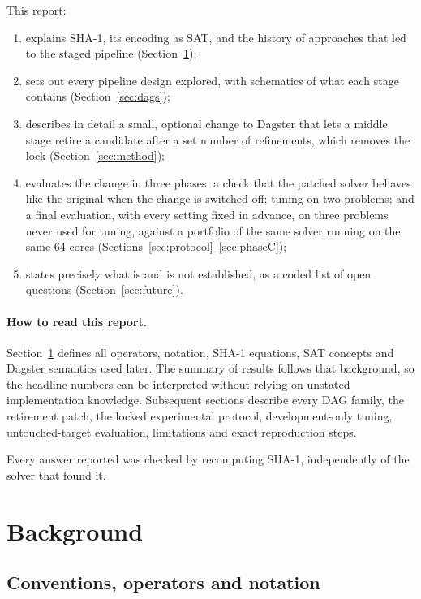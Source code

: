 \documentclass[11pt,a4paper]{article}
\begin{document}
This report:
\begin{enumerate}
\item explains SHA-1, its encoding as SAT, and the history of approaches that led to the
staged pipeline (Section~\ref{sec:background});
\item sets out every pipeline design explored, with schematics of what each stage contains
(Section~\ref{sec:dags});
\item describes in detail a small, optional change to Dagster that lets a middle stage retire a
candidate after a set number of refinements, which removes the lock (Section~\ref{sec:method});
\item evaluates the change in three phases: a check that the patched solver behaves like the original
when the change is switched off; tuning on two problems; and a final evaluation, with every setting
fixed in advance, on three problems never used for tuning, against a portfolio of the same solver
running on the same 64 cores (Sections~\ref{sec:protocol}--\ref{sec:phaseC});
\item states precisely what is and is not established, as a coded list of open questions
(Section~\ref{sec:future}).
\end{enumerate}


\paragraph{How to read this report.}
Section~\ref{sec:background} defines all operators, notation, SHA-1 equations, SAT concepts and
Dagster semantics used later. The summary of results follows that background, so the headline
numbers can be interpreted without relying on unstated implementation knowledge. Subsequent
sections describe every DAG family, the retirement patch, the locked experimental protocol,
development-only tuning, untouched-target evaluation, limitations and exact reproduction steps.

Every answer reported was checked by recomputing SHA-1, independently of the solver that found it.

\section{Background}\label{sec:background}

\subsection{Conventions, operators and notation}\label{sec:notation}
\end{document}
